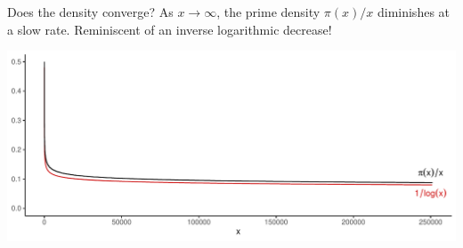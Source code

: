 \documentclass[,aspectratio=169]{beamer}
\begin{document}
\begin{frame}{Does the density converge?}
\protect\hypertarget{does-the-density-converge}{}
As \(x\to\infty\), the prime density \(\pi(x)/x\) diminishes at a slow
rate. Reminiscent of an inverse logarithmic decrease!

\vspace{1em}

\includegraphics{figure/unnamed-chunk-4-1.pdf}
\end{frame}
\end{document}
